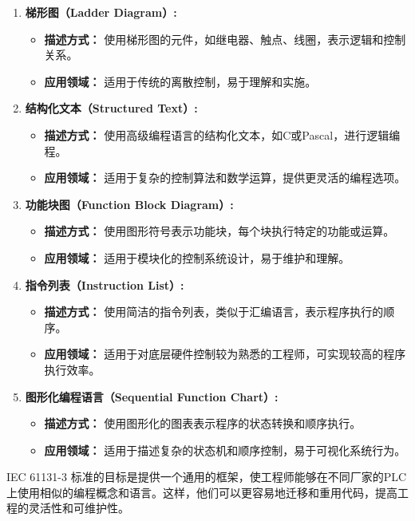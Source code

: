 \documentclass{book}
\begin{document}
	\begin{enumerate}[label=--]
		\item \textbf{梯形图（Ladder Diagram）:}
		\begin{itemize}
			\item \textbf{描述方式：} 使用梯形图的元件，如继电器、触点、线圈，表示逻辑和控制关系。
			\item \textbf{应用领域：} 适用于传统的离散控制，易于理解和实施。
		\end{itemize}
		
		\item \textbf{结构化文本（Structured Text）:}
		\begin{itemize}
			\item \textbf{描述方式：} 使用高级编程语言的结构化文本，如C或Pascal，进行逻辑编程。
			\item \textbf{应用领域：} 适用于复杂的控制算法和数学运算，提供更灵活的编程选项。
		\end{itemize}
		
		\item \textbf{功能块图（Function Block Diagram）:}
		\begin{itemize}
			\item \textbf{描述方式：} 使用图形符号表示功能块，每个块执行特定的功能或运算。
			\item \textbf{应用领域：} 适用于模块化的控制系统设计，易于维护和理解。
		\end{itemize}
		
		\item \textbf{指令列表（Instruction List）:}
		\begin{itemize}
			\item \textbf{描述方式：} 使用简洁的指令列表，类似于汇编语言，表示程序执行的顺序。
			\item \textbf{应用领域：} 适用于对底层硬件控制较为熟悉的工程师，可实现较高的程序执行效率。
		\end{itemize}
		
		\item \textbf{图形化编程语言（Sequential Function Chart）:}
		\begin{itemize}
			\item \textbf{描述方式：} 使用图形化的图表表示程序的状态转换和顺序执行。
			\item \textbf{应用领域：} 适用于描述复杂的状态机和顺序控制，易于可视化系统行为。
		\end{itemize}
	\end{enumerate}
	
	IEC 61131-3 标准的目标是提供一个通用的框架，使工程师能够在不同厂家的PLC上使用相似的编程概念和语言。这样，他们可以更容易地迁移和重用代码，提高工程的灵活性和可维护性。
\end{document}
